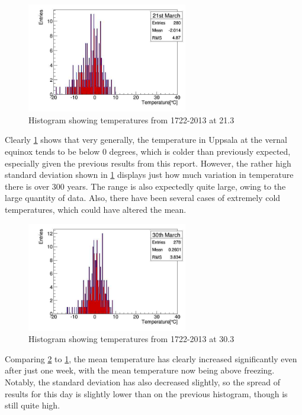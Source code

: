 \documentclass[a4paper,10pt,oneside]{article}
\begin{document}
\begin{figure}[!ht]
  \begin{center}
    \includegraphics[width=7cm]{../Code/Equinox_temps.jpg}
    \caption{Histogram showing temperatures from 1722-2013 at 21.3}
    \label{fig:vern}
  \end{center}
\end{figure}

Clearly \ref{fig:vern} shows that very generally, the temperature in Uppsala at the
vernal equinox tends to be below 0 degrees, which is colder than previously expected, especially given the previous
results from this report. However, the rather high standard deviation
shown in \ref{fig:vern} displays just how much variation in temperature there is over 300 years.
The range is also expectedly quite large, owing to the large quantity of data. Also, there have been several cases of extremely
cold temperatures, which could have altered the mean.

\begin{figure}[!ht]
 \begin{center}
  \includegraphics[width=7cm]{../Code/week.jpg}
  \caption{Histogram showing temperatures from 1722-2013 at 30.3}
  \label{fig:week}
 \end{center}
\end{figure}

Comparing \ref{fig:week} to \ref{fig:vern}, the mean temperature has clearly increased significantly even
after just one week, with the mean temperature now being above freezing. Notably, the standard deviation
has also decreased slightly, so the spread of results for this day is slightly lower than on the previous histogram, though is
still quite high.
\end{document}
